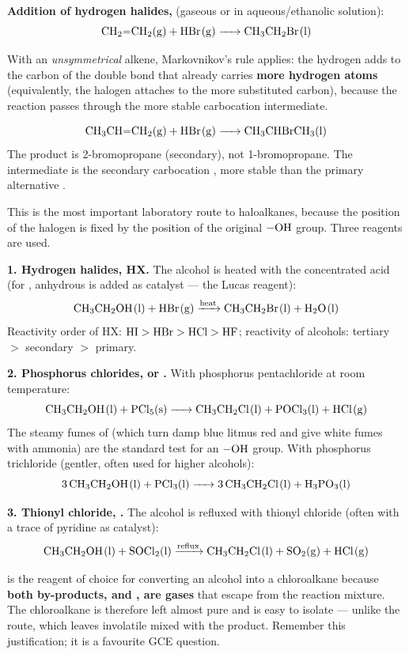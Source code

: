 \documentclass[11pt]{article}
\newcommand{\cle}[1]{{\popxbold\color{popdark}#1}}
\newcounter{popsec}
\newcounter{popsub}
\newcommand{\courssub}[1]{%
  \stepcounter{popsub}%
  \par\vspace{9pt}\noindent{\popxbold\fontsize{11.5}{13}\selectfont\color{popink}{\color{poporange}\thepopsec.\thepopsub}\hspace{6pt}#1}\par\nopagebreak\vspace{4pt}
}
\begin{document}
\textbf{Addition of hydrogen halides, } (gaseous or in aqueous/ethanolic solution):
\[ \ce{CH2=CH2(g) + HBr(g) -> CH3CH2Br(l)} \]

With an \emph{unsymmetrical} alkene, \cle{Markovnikov's rule} applies: the hydrogen adds to the carbon of the double bond that already carries \textbf{more hydrogen atoms} (equivalently, the halogen attaches to the more substituted carbon), because the reaction passes through the more stable carbocation intermediate.

\begin{exemplebox}
\[ \ce{CH3CH=CH2(g) + HBr(g) -> CH3CHBrCH3(l)} \]
The product is 2-bromopropane (secondary), not 1-bromopropane. The intermediate is the secondary carbocation , more stable than the primary alternative .
\end{exemplebox}

\courssub{Preparation from Alcohols: Replacing $-$OH by $-$X}

This is the most important laboratory route to haloalkanes, because the position of the halogen is fixed by the position of the original $-\ce{OH}$ group. Three reagents are used.

\textbf{1. Hydrogen halides, HX.} The alcohol is heated with the concentrated acid (for , anhydrous  is added as catalyst --- the Lucas reagent):
\[ \ce{CH3CH2OH(l) + HBr(g) ->[heat] CH3CH2Br(l) + H2O(l)} \]
Reactivity order of HX: $\ce{HI} > \ce{HBr} > \ce{HCl} > \ce{HF}$; reactivity of alcohols: tertiary $>$ secondary $>$ primary.

\textbf{2. Phosphorus chlorides,  or .} With phosphorus pentachloride at room temperature:
\[ \ce{CH3CH2OH(l) + PCl5(s) -> CH3CH2Cl(l) + POCl3(l) + HCl(g)} \]
The steamy fumes of  (which turn damp blue litmus red and give white fumes with ammonia) are the standard test for an $-\ce{OH}$ group. With phosphorus trichloride (gentler, often used for higher alcohols):
\[ \ce{3CH3CH2OH(l) + PCl3(l) -> 3CH3CH2Cl(l) + H3PO3(l)} \]

\textbf{3. Thionyl chloride, .} The alcohol is refluxed with thionyl chloride (often with a trace of pyridine as catalyst):
\[ \ce{CH3CH2OH(l) + SOCl2(l) ->[reflux] CH3CH2Cl(l) + SO2(g) + HCl(g)} \]

\begin{attention}
 is the reagent of choice for converting an alcohol into a chloroalkane because \textbf{both by-products,  and , are gases} that escape from the reaction mixture. The chloroalkane is therefore left almost pure and is easy to isolate --- unlike the  route, which leaves involatile  mixed with the product. Remember this justification; it is a favourite GCE question.
\end{attention}
\end{document}
